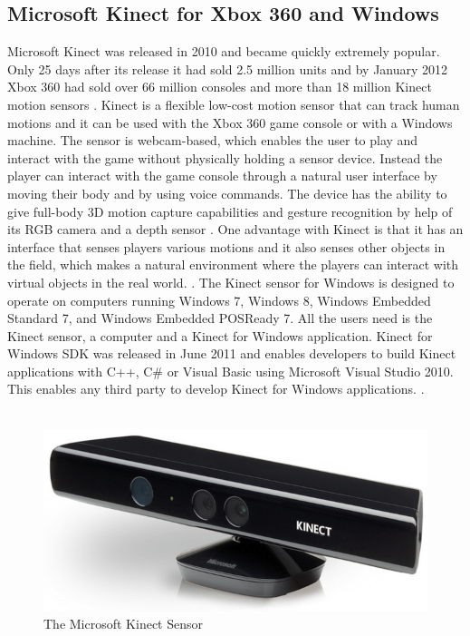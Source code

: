 \subsection{Microsoft Kinect for Xbox 360 and Windows}
Microsoft Kinect was released in 2010 and became quickly extremely popular. Only 25 days after its release it had sold 2.5 million units and by January 2012 Xbox 360 had sold over 66 million consoles and more than 18 million Kinect motion sensors \cite{consoles} \cite{kinectsold}. Kinect is a flexible low-cost motion sensor that can track human motions and it can be used with the Xbox 360 game console or with a Windows machine.  The sensor is webcam-based, which enables the user to play and interact with the game without physically holding a sensor device. Instead the player can interact with the game console through a natural user interface by moving their body and by using voice commands. The device has the ability to give full-body 3D motion capture capabilities and gesture recognition by help of its RGB camera and a depth sensor \cite{kinect}. One advantage with Kinect is that it has an interface that senses players various motions and it also senses other objects in the field, which makes a natural environment where the players can interact with virtual objects in the real world. \cite{comparison}. The Kinect sensor for Windows is designed to operate on computers running Windows 7, Windows 8, Windows Embedded Standard 7, and Windows Embedded POSReady 7. All the users need is the Kinect sensor, a computer and a Kinect for Windows application. Kinect for Windows SDK was released in June 2011 and enables developers to build Kinect applications with C++, C\# or Visual Basic using Microsoft Visual Studio 2010. This enables any third party to develop Kinect for Windows applications. \cite{kinectwindows}.\\ \\
\begin{figure}[h!]
\begin{center}
\includegraphics[scale=0.3]{kinect}
\caption[Kinect Sensor]{The Microsoft Kinect Sensor}
\label{fig:KinectSensor}
\end{center}
\end{figure}

